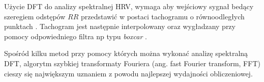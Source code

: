 Użycie DFT do analizy spektralnej HRV, wymaga aby wejściowy sygnał bedący szeregiem odstępów
$RR$ przedstawić w postaci tachogramu o równoodległych punktach \cite{splines}. Tachogram jest następnie
interpolowany oraz wygładzany przy pomocy odpowiedniego filtra np typu \emph{boxcar} \cite{boxcar}.

Spośród kilku metod przy pomocy których można wykonać analizę spektralną DFT,
algorytm szybkiej transformaty Fouriera (ang. fast Fourier transform, FFT) \cite{cooleyfft} cieszy się
największym uznaniem z powodu najlepszej wydajności obliczeniowej.